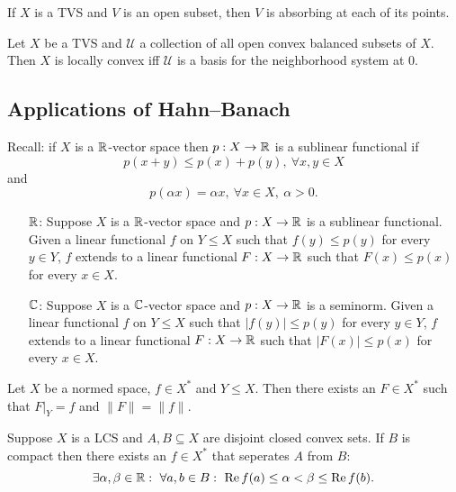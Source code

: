 \begin{remark}
  If $X$ is a TVS and $V$ is an open subset, then $V$ is absorbing at each of its points.
\end{remark}

\begin{corollary}
  Let $X$ be a TVS and $\mathcal{U}$ a collection of all open convex balanced subsets of $X$.
  Then $X$ is locally convex iff $\mathcal{U}$ is a basis for the neighborhood system at $0$.
\end{corollary}

\subsection{Applications of Hahn--Banach}

Recall: if $X$ is a $\mathbb {R}$-vector space then $p: X \to \mathbb {R}$
is a sublinear functional if $$p(x + y) \leq p(x) + p(y),\ \forall x, y \in X$$ and $$p(\alpha x) = \alpha x,\ \forall x \in X,\ \alpha > 0.$$

\begin{theorem}
  \begin{itemize}
    \item[$\mathbb {R}$:] Suppose $X$ is a $\mathbb {R}$-vector space and $p: X \to \mathbb {R}$ is a sublinear functional.
    Given a linear functional $f$ on $Y \leq X$ such that $f(y) \leq p(y)$ for every $y \in Y$,
    $f$ extends to a linear functional $F: X \to \mathbb {R}$ such that $F(x) \leq p(x)$ for every $x \in X$.
    \item[$\mathbb {C}$:] Suppose $X$ is a $\mathbb {C}$-vector space and $p: X \to \mathbb {R}$ is a seminorm.
    Given a linear functional $f$ on $Y \leq X$ such that $|f(y)| \leq p(y)$ for every $y \in Y$,
    $f$ extends to a linear functional $F: X \to \mathbb {R}$ such that $|F(x)| \leq p(x)$ for every $x \in X$.
  \end{itemize}
\end{theorem}

\begin{corollary}
  Let $X$ be a normed space, $f \in X^*$ and $Y \leq X$.
  Then there exists an $F \in X^*$ such that $F\big|_Y = f$ and $\|F\| = \| f\|$.
\end{corollary}

\begin{corollary}
  Suppose $X$ is a LCS and $A, B \subseteq X$ are disjoint closed convex sets.
  If $B$ is compact then there exists an $f \in X^*$ that seperates $A$ from $B$:
  $$\exists \alpha, \beta \in \mathbb {R}:\ \forall a, b \in B:\ \operatorname{Re} f(a) \leq \alpha < \beta \leq \operatorname{Re} f(b).$$
\end{corollary}

